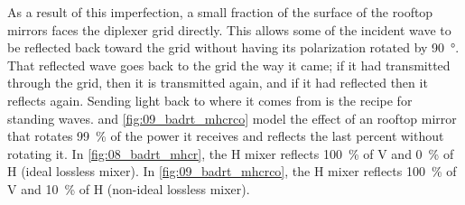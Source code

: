 As a result of this imperfection, a small fraction of the surface of the rooftop mirrors faces the diplexer grid directly.
This allows some of the incident wave to be reflected back toward the grid without having its polarization rotated by \SI{90}{\degree}.
That reflected wave goes back to the grid the way it came; if it had transmitted through the grid, then it is transmitted again, and if it had reflected then it reflects again.
Sending light back to where it comes from is the recipe for standing waves.
 and \cref{fig:09_badrt_mhcrco} model the effect of an rooftop mirror that rotates \SI{99}{\percent} of the power it receives and reflects the last percent without rotating it.
In \cref{fig:08_badrt_mhcr}, the H mixer reflects \SI{100}{\percent} of V and \SI{0}{\percent} of H (ideal lossless mixer).
In \cref{fig:09_badrt_mhcrco}, the H mixer reflects \SI{100}{\percent} of V and \SI{10}{\percent} of H (non-ideal lossless mixer).

